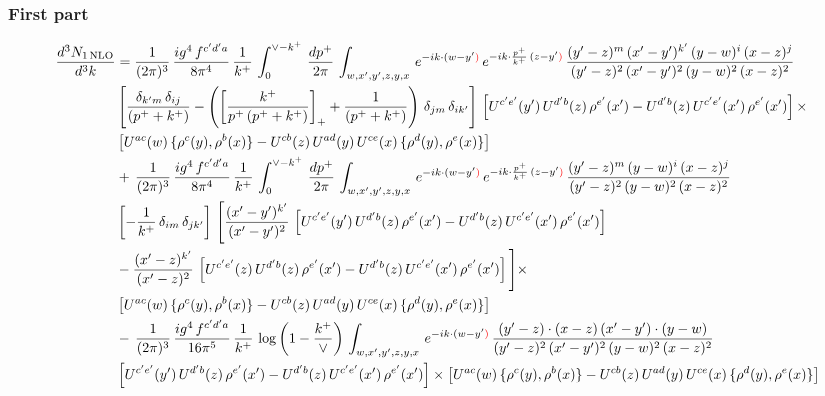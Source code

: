 \documentclass[9pt]{article}
\numberwithin{equation}{section}
\begin{document}
\subsubsection{First part}
\begin{align}
     \frac{d^{3}N_{1\,\rm NLO}}{d^{3}k} & =  \frac{1}{(2\pi)^{3}}\, \frac{ig^{4}\,f^{c'd'a}}{8\pi^{4}}\, \frac{1}{k^{+}}\,\int_{0}^{\vee-k^{+}}\,  \frac{dp^{+}}{2\pi}\, \int_{w,x',y',z,y,x}\, e^{-ik\cdot (w-y'{\color{red})}}\, e^{-ik\cdot \frac{p^{+}}{k^{+}}\,(z-y'{\color{red})}}\,\frac{(y'-z)^{m}\,(x'-y')^{k'}\,(y-w)^{i}\,(x-z)^{j}}{(y'-z)^{2}\,(x'-y')^{2}\,(y-w)^{2}\,(x-z)^{2}}\notag \\ & \left[\frac{\delta_{k'm}\,\delta_{ij}}{(p^{+}+k^{+})}-\left(\left[\frac{k^{+}}{p^{+}\,(p^{+}+k^{+})}\right]_{+}+\frac{1}{(p^{+}+k^{+})}\right)\,\delta_{jm}\,\delta_{ik'}\right]\, \left[U^{c'e'}(y')\,U^{d'b}(z)\,\rho^{e'}(x')-U^{d'b}(z)\,U^{c'e'}(x')\,\rho^{e'}(x')\right]\times\notag \\ &  \left[U^{ac}(w)\, \{\rho^{c}(y),\rho^{b}(x)\}-U^{cb}(z)\,U^{ad}(y)\,U^{ce}(x)\,\{\rho^{d}(y),\rho^{e}(x)\}\right] \notag \\
&  +\,\frac{1}{(2\pi)^{3}}\, \frac{ig^{4}\,f^{c'd'a}}{8\pi^{4}}\, \frac{1}{k^{+}}\,\int_{0}^{\vee-k^{+}}\,  \frac{dp^{+}}{2\pi}\, \int_{w,x',y',z,y,x}\, e^{-ik\cdot (w-y'{\color{red})}}\, e^{-ik\cdot \frac{p^{+}}{k^{+}}\,(z-y'{\color{red})}}\,\frac{(y'-z)^{m}\,(y-w)^{i}\,(x-z)^{j}}{(y'-z)^{2}\,(y-w)^{2}\,(x-z)^{2}}\notag \\ &   \left[-\frac{1}{k^{+}}\, \delta_{im}\, \delta_{jk'}\right]\, \Bigg[\frac{(x'-y')^{k'}}{(x'-y')^{2}}\,\left[U^{c'e'}(y')\,U^{d'b}(z)\,\rho^{e'}(x')-U^{d'b}(z)\,U^{c'e'}(x')\,\rho^{e'}(x')\right]\notag \\ & -\frac{(x'-z)^{k'}}{(x'-z)^{2}}\,\left[U^{c'e'}(z)\,U^{d'b}(z)\,\rho^{e'}(x')-U^{d'b}(z)\,U^{c'e'}(x')\,\rho^{e'}(x')\right]\Bigg]\times\notag \\ &   \left[U^{ac}(w)\, \{\rho^{c}(y),\rho^{b}(x)\}-U^{cb}(z)\,U^{ad}(y)\,U^{ce}(x)\,\{\rho^{d}(y),\rho^{e}(x)\}\right] \notag \\
& -\,\frac{1}{(2\pi)^{3}}\, \frac{ig^{4}\,f^{c'd'a}}{16\pi^{5}}\, \frac{1}{k^{+}}\,\log{\left(1-\frac{k^{+}}{\vee}\right)}\, \int_{w,x',y',z,y,x}\, e^{-ik\cdot (w-y'{\color{red})}}\,\frac{(y'-z)\cdot (x-z)\,(x'-y')\cdot (y-w)}{(y'-z)^{2}\,(x'-y')^{2}\,(y-w)^{2}\,(x-z)^{2}}\notag \\ &  \left[U^{c'e'}(y')\,U^{d'b}(z)\,\rho^{e'}(x')-U^{d'b}(z)\,U^{c'e'}(x')\,\rho^{e'}(x')\right]\times  \left[U^{ac}(w)\, \{\rho^{c}(y),\rho^{b}(x)\}-U^{cb}(z)\,U^{ad}(y)\,U^{ce}(x)\,\{\rho^{d}(y),\rho^{e}(x)\}\right]

\end{align}
\end{document}
